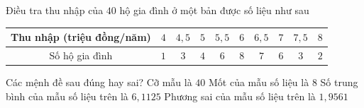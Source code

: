 \begin{ex}%
	 Điều tra thu nhập của $40$ hộ gia đình ở một bản được số liệu như sau
	\begin{center}
		\begin{tabular}{|c|c|c|c|c|c|c|c|c|c|}
			\hline Thu nhập (triệu đồng/năm) & $4$ & $4{,}5$ & $5$ & $5{,}5$ & $6$ & $6{,}5$ & $7$ &  $7{,}5$ & $8$ \\
			\hline Số hộ gia đình & $1$ & $3$ & $4$ & $6$ &  $8$ & $7$ & $6$ & $3$ & $2$ \\
			\hline 
		\end{tabular}
	\end{center}
	Các mệnh đề  sau đúng hay sai?
	\choiceTF 
		{\True Cỡ mẫu là  $40$}
		{Mốt của mẫu số liệu  là $8$}
		{\True  Số trung bình của mẫu số liệu trên là $6{,}1125$}
		{Phương sai  của mẫu số liệu trên là $1{,}9561$}
\end{ex}

